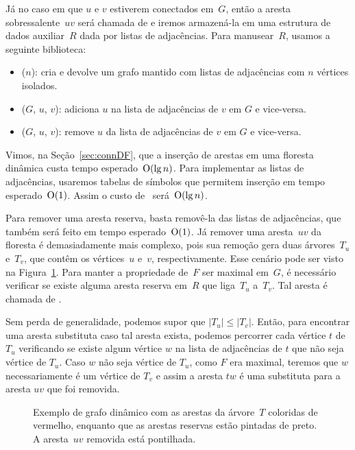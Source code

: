 Já no caso em que $u$ e $v$ estiverem conectados em~$G$, então a aresta sobressalente~$uv$ será chamada de  e iremos armazená-la em uma estrutura de dados auxiliar~$R$ dada por listas de adjacências. Para manusear~$R$, usamos a seguinte biblioteca:
\begin{itemize}
    \item \graphCreate($n$): cria e devolve um grafo mantido com listas de adjacências com $n$ vértices isolados.
    \item \graphAdd($G$, $u$, $v$): adiciona $u$ na lista de adjacências de $v$ em $G$ e vice-versa.
    \item \graphDel($G$, $u$, $v$): remove $u$ da lista de adjacências de $v$ em $G$ e vice-versa.
\end{itemize}

 Vimos, na Seção~\ref{sec:connDF}, que a inserção de arestas em uma floresta dinâmica custa tempo esperado~$\mathrm{O}(\lg n)$. Para implementar as listas de adjacências, usaremos tabelas de símbolos que permitem inserção em tempo esperado~$\mathrm{O}(1)$. Assim o custo de~\dymGraphAddEdge{} será~$\mathrm{O}(\lg n)$.

Para remover uma aresta reserva, basta removê-la das listas de adjacências, que também será feito em tempo esperado~$\mathrm{O}(1)$. Já remover uma aresta~$uv$ da floresta é demasiadamente mais complexo, pois sua remoção gera duas árvores~$T_u$ e~$T_v$, que contêm os vértices~$u$ e~$v$, respectivamente. Esse cenário pode ser visto na Figura~\ref{fig:DG-exemploTu-Tv}. Para manter a propriedade de~$F$ ser maximal em~$G$, é necessário verificar se existe alguma aresta reserva em~$R$ que liga~$T_u$ a~$T_v$. Tal aresta é chamada de .

Sem perda de generalidade, podemos supor que  $|T_u|\leqslant |T_v|$. Então, para encontrar uma aresta substituta caso tal aresta exista, podemos percorrer cada vértice $t$ de $T_u$ verificando se existe algum vértice $w$ na lista de adjacências de $t$ que não seja vértice de $T_u$. Caso $w$ não seja vértice de $T_u$, como $F$ era maximal, teremos que $w$ necessariamente é um vértice de $T_v$ e assim a aresta $tw$ é uma substituta para a aresta $uv$ que foi removida.

\begin{figure}[htb]
\centering
\caption{Exemplo de grafo dinâmico com as arestas da árvore~$T$ coloridas de vermelho, enquanto que as arestas reservas estão pintadas de preto. A aresta~$uv$ removida está pontilhada.}
\label{fig:DG-exemploTu-Tv}
\end{figure}

